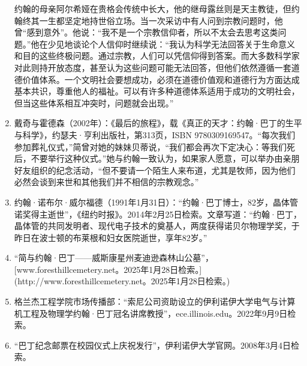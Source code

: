 \begin{enumerate}
约翰的母亲阿尔希娅在贵格会传统中长大，他的继母露丝则是天主教徒，但约翰终其一生都坚定地持世俗立场。当一次采访中有人问到宗教问题时，他曾“感到意外”。他说：“我不是一个宗教信仰者，所以不太会去思考这类问题。”他在少见地谈论个人信仰时继续说：“我认为科学无法回答关于生命意义和目的这些终极问题。通过宗教，人们可以凭信仰得到答案。而大多数科学家对此则持开放态度，甚至认为这些问题可能无法回答，但他们依然遵循一套道德价值体系。一个文明社会要想成功，必须在道德价值观和道德行为方面达成基本共识，尊重他人的福祉。可以有许多种道德体系适用于成功的文明社会，但当这些体系相互冲突时，问题就会出现。”
\item 戴奇与霍德森（2002年）：《最后的旅程》，载《真正的天才：约翰·巴丁的生平与科学》，约瑟夫·亨利出版社，第313页，ISBN 9780309169547。“每次我们参加葬礼仪式，”简曾对她的妹妹贝蒂说，“我们都会再次下定决心：等我们死后，不要举行这种仪式。”她与约翰一致认为，如果家人愿意，可以举办由亲朋好友组织的纪念活动，“但不要请一个陌生人来布道，尤其是牧师，因为他们必然会谈到来世和其他我们并不相信的宗教观念。”
\item 约翰·诺布尔·威尔福德（1991年1月31日）：“约翰·巴丁博士，82岁，晶体管诺奖得主逝世”，《纽约时报》。2014年2月25日检索。文章写道：“约翰·巴丁，晶体管的共同发明者、现代电子技术的奠基人，两度获得诺贝尔物理学奖，于昨日在波士顿的布莱根和妇女医院逝世，享年82岁。”
\item “简与约翰·巴丁——威斯康星州麦迪逊森林山公墓”，[www.foresthillcemetery.net。2025年1月28日检索。](http://www.foresthillcemetery.net。2025年1月28日检索。)
\item 格兰杰工程学院市场传播部：“索尼公司资助设立的伊利诺伊大学电气与计算机工程及物理学约翰·巴丁冠名讲席教授”，ece.illinois.edu。2022年9月9日检索。
\item “巴丁纪念邮票在校园仪式上庆祝发行”，伊利诺伊大学官网。2008年3月4日检索。
\end{enumerate}
